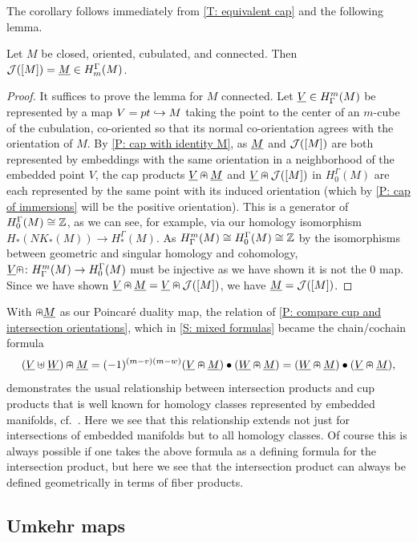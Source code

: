 The corollary follows immediately from \cref{T: equivalent cap} and the following lemma.

\begin{lemma}
	Let $M$ be closed, oriented, cubulated, and connected.
	Then $\mathcal{J}([M]) = \underline{M} \in H_m^\Gamma(M)$.
\end{lemma}

\begin{proof}
	It suffices to prove the lemma for $M$ connected.
	Let $\underline{V} \in H^m_\Gamma(M)$ be represented by a map $V = pt \hookrightarrow M$ taking the point to the center of an $m$-cube of the cubulation, co-oriented so that its normal co-orientation agrees with the orientation of $M$.
	By \cref{P: cap with identity M}, as $\underline{M}$ and $\mathcal{J}([M])$ are both represented by embeddings with the same orientation in a neighborhood of the embedded point $V$, the cap products $\underline{V}\nplus \underline{M}$ and $\underline{V}\nplus \mathcal{J}([M])$ in $H_0^\Gamma(M)$ are each represented by the same point with its induced orientation (which by \cref{P: cap of immersions} will be the positive orientation).
	This is a generator of $H_0^\Gamma(M) \cong \mathbb{Z}$, as we can see, for example, via our homology isomorphism $H_*(NK_*(M)) \to H_*^\Gamma(M)$.
	As $H^m_\Gamma(M) \cong H_0^\Gamma(M) \cong \mathbb{Z}$ by the isomorphisms between geometric and singular homology and cohomology, $\underline{V}\nplus \colon H^m_\Gamma(M) \to H_0^\Gamma(M)$ must be injective as we have shown it is not the $0$ map.
	Since we have shown $\underline{V}\nplus\underline{M} = \underline{V}\nplus\mathcal{J}([M])$, we have $\underline{M} = \mathcal{J}([M])$.
\end{proof}

With $\nplus \underline{M}$ as our Poincar\'e duality map, the relation of \cref{P: compare cup and intersection orientations}, which in \cref{S: mixed formulas} became the chain/cochain formula
$$(\underline{V}\uplus \underline{W})\nplus \underline{M} = (-1)^{(m-v)(m-w)}(\underline{V}\nplus \underline{M})\bullet(\underline{W}\nplus \underline{M}) = (\underline{W}\nplus \underline{M})\bullet(\underline{V}\nplus \underline{M}),$$
demonstrates the usual relationship between intersection products and cup products that is well known for homology classes represented by embedded manifolds, cf.\ \cite[Section VI.11]{Bred97}.
Here we see that this relationship extends not just for intersections of embedded manifolds but to all homology classes.
Of course this is always possible if one takes the above formula as a defining formula for the intersection product, but here we see that the intersection product can always be defined geometrically in terms of fiber products.

\subsection{Umkehr maps}\label{S: umkehr}


